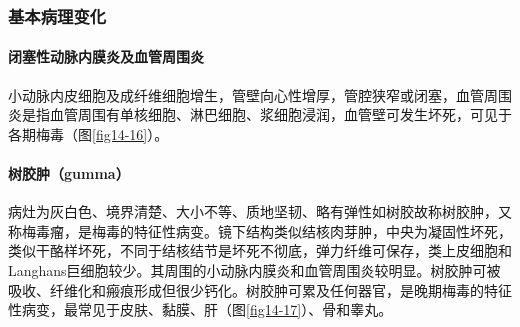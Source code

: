 \subsubsection{基本病理变化}

\paragraph{闭塞性动脉内膜炎及血管周围炎}
小动脉内皮细胞及成纤维细胞增生，管壁向心性增厚，管腔狭窄或闭塞，血管周围炎是指血管周围有单核细胞、淋巴细胞、浆细胞浸润，血管壁可发生坏死，可见于各期梅毒（图\ref{fig14-16}）。

\paragraph{树胶肿（gumma）}
病灶为灰白色、境界清楚、大小不等、质地坚韧、略有弹性如树胶故称树胶肿，又称梅毒瘤，是梅毒的特征性病变。镜下结构类似结核肉芽肿，中央为凝固性坏死，类似干酪样坏死，不同于结核结节是坏死不彻底，弹力纤维可保存，类上皮细胞和Langhans巨细胞较少。其周围的小动脉内膜炎和血管周围炎较明显。树胶肿可被吸收、纤维化和瘢痕形成但很少钙化。树胶肿可累及任何器官，是晚期梅毒的特征性病变，最常见于皮肤、黏膜、肝（图\ref{fig14-17}）、骨和睾丸。

